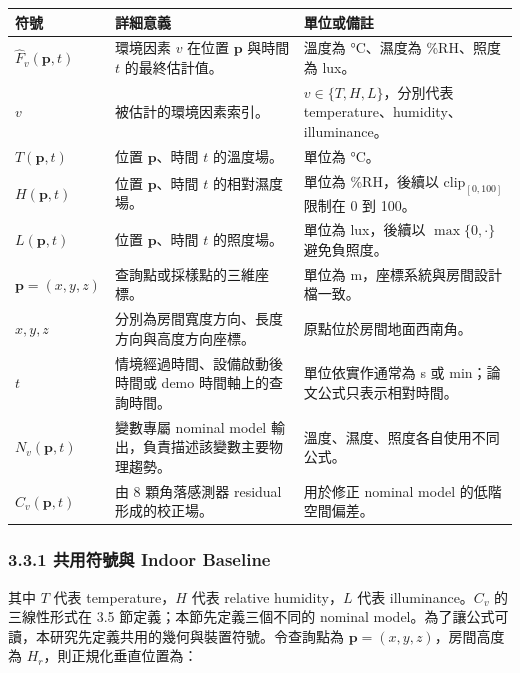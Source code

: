 \documentclass[12pt,a4paper]{article}
\begin{document}
\begin{table}[htbp]
\centering
\footnotesize
\renewcommand{\arraystretch}{1.25}
\begin{tabular}{|>{\raggedright\arraybackslash}p{}|>{\raggedright\arraybackslash}p{}|>{\raggedright\arraybackslash}p{}|}
\hline
\textbf{符號} & \textbf{詳細意義} & \textbf{單位或備註} \\
\hline
$\hat{F}_v(\mathbf{p},t)$ & 環境因素 $v$ 在位置 $\mathbf{p}$ 與時間 $t$ 的最終估計值。 & 溫度為 °C、濕度為 \%RH、照度為 lux。 \\
\hline
$v$ & 被估計的環境因素索引。 & $v\in\{T,H,L\}$，分別代表 temperature、humidity、illuminance。 \\
\hline
$T(\mathbf{p},t)$ & 位置 $\mathbf{p}$、時間 $t$ 的溫度場。 & 單位為 °C。 \\
\hline
$H(\mathbf{p},t)$ & 位置 $\mathbf{p}$、時間 $t$ 的相對濕度場。 & 單位為 \%RH，後續以 $\mathrm{clip}_{[0,100]}$ 限制在 0 到 100。 \\
\hline
$L(\mathbf{p},t)$ & 位置 $\mathbf{p}$、時間 $t$ 的照度場。 & 單位為 lux，後續以 $\max\{0,\cdot\}$ 避免負照度。 \\
\hline
$\mathbf{p}=(x,y,z)$ & 查詢點或採樣點的三維座標。 & 單位為 m，座標系統與房間設計檔一致。 \\
\hline
$x,y,z$ & 分別為房間寬度方向、長度方向與高度方向座標。 & 原點位於房間地面西南角。 \\
\hline
$t$ & 情境經過時間、設備啟動後時間或 demo 時間軸上的查詢時間。 & 單位依實作通常為 s 或 min；論文公式只表示相對時間。 \\
\hline
$N_v(\mathbf{p},t)$ & 變數專屬 nominal model 輸出，負責描述該變數主要物理趨勢。 & 溫度、濕度、照度各自使用不同公式。 \\
\hline
$C_v(\mathbf{p},t)$ & 由 8 顆角落感測器 residual 形成的校正場。 & 用於修正 nominal model 的低階空間偏差。 \\
\hline
\end{tabular}
\end{table}

\subsubsection*{3.3.1 共用符號與 Indoor Baseline}

其中 $T$ 代表 temperature，$H$ 代表 relative humidity，$L$ 代表 illuminance。$C_v$ 的三線性形式在 3.5 節定義；本節先定義三個不同的 nominal model。為了讓公式可讀，本研究先定義共用的幾何與裝置符號。令查詢點為 $\mathbf{p}=(x,y,z)$，房間高度為 $H_r$，則正規化垂直位置為：
\end{document}

